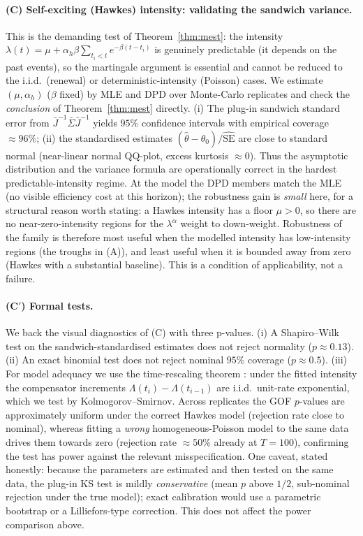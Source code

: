 \documentclass[11pt]{article}
\begin{document}
\paragraph{(C) Self-exciting (Hawkes) intensity: validating the sandwich variance.}
This is the demanding test of Theorem~\ref{thm:mest}: the intensity
$\lambda(t)=\mu+\alpha_h\beta\sum_{t_i<t}e^{-\beta(t-t_i)}$ is genuinely
predictable (it depends on the past events), so the martingale argument is
essential and cannot be reduced to the i.i.d.\ (renewal) or deterministic-intensity
(Poisson) cases. We estimate $(\mu,\alpha_h)$ ($\beta$ fixed) by MLE and DPD over
Monte-Carlo replicates and check the \emph{conclusion} of Theorem~\ref{thm:mest}
directly. (i) The plug-in sandwich standard error from $\bar J^{-1}\bar\Sigma\bar
J^{-1}$ yields $95\%$ confidence intervals with empirical coverage $\approx96\%$;
(ii) the standardised estimates $(\hat\theta-\theta_0)/\widehat{\mathrm{SE}}$ are
close to standard normal (near-linear normal QQ-plot, excess kurtosis $\approx0$).
Thus the asymptotic distribution and the variance formula are operationally
correct in the hardest predictable-intensity regime. At the model the DPD members
match the MLE (no visible efficiency cost at this horizon); the robustness gain is
\emph{small} here, for a structural reason worth stating: a Hawkes intensity has a
floor $\mu>0$, so there are no near-zero-intensity regions for the $\lambda^{\alpha}$
weight to down-weight. Robustness of the family is therefore most useful when the
modelled intensity has low-intensity regions (the troughs in (A)), and least useful
when it is bounded away from zero (Hawkes with a substantial baseline). This is a
condition of applicability, not a failure.

\paragraph{(C$'$) Formal tests.}
We back the visual diagnostics of (C) with three p-values. (i) A Shapiro--Wilk
test on the sandwich-standardised estimates does not reject normality
($p\approx0.13$). (ii) An exact binomial test does not reject nominal $95\%$
coverage ($p\approx0.5$). (iii) For model adequacy we use the time-rescaling
theorem \citep{ogata1988,abgk1993}: under the fitted intensity the compensator
increments $\Lambda(t_i)-\Lambda(t_{i-1})$ are i.i.d.\ unit-rate exponential, which
we test by Kolmogorov--Smirnov. Across replicates the GOF $p$-values are
approximately uniform under the correct Hawkes model (rejection rate close to
nominal), whereas fitting a \emph{wrong} homogeneous-Poisson model to the same data
drives them towards zero (rejection rate $\approx50\%$ already at $T=100$),
confirming the test has power against the relevant misspecification. One caveat,
stated honestly: because the parameters are estimated and then tested on the same
data, the plug-in KS test is mildly \emph{conservative} (mean $p$ above $1/2$, sub-nominal
rejection under the true model); exact calibration would use a parametric bootstrap
or a Lilliefors-type correction. This does not affect the power comparison above.
\end{document}
